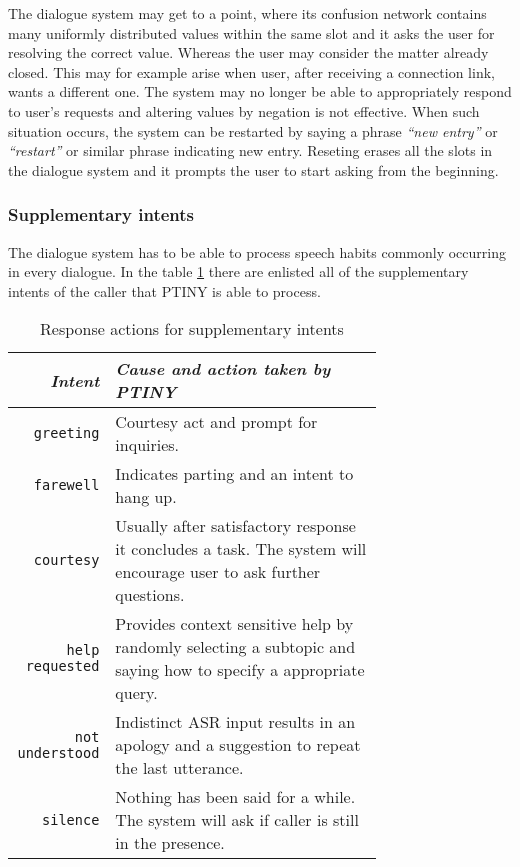 The dialogue system may get to a point, where its confusion network contains many uniformly distributed values within the same slot and it asks the user for resolving the correct value.
Whereas the user may consider the matter already closed.
This may for example arise when user, after receiving a connection link, wants a different one.
The system may no longer be able to appropriately respond to user's requests and altering values by negation is not effective.
When such situation occurs, the system can be restarted by saying a phrase \textit{``new entry''} or \textit{``restart''} or similar phrase indicating new entry.
Reseting erases all the slots in the dialogue system and it prompts the user to start asking from the beginning.

\newpage

\subsubsection{Supplementary intents} %

The dialogue system has to be able to process speech habits commonly occurring in every dialogue.
In the table \ref{table:sup} there are enlisted all of the supplementary intents of the caller that \ac{PTINY} is able to process.

\begin{table}[h]
\centering
\begin{tabular}{ r | p{0.73\linewidth} }
	\textit{Intent} & \textit{Cause and action taken by \ac{PTINY}} \\ \hline
	\texttt{greeting} & Courtesy act and prompt for inquiries.\\
	\texttt{farewell} & Indicates parting and an intent to hang up.\\
	\texttt{courtesy} & Usually after satisfactory response it concludes a task. The system will encourage user to ask further questions. \\
	\texttt{help requested} & Provides context sensitive help by randomly selecting a subtopic and saying how to specify a appropriate query. \\
	\texttt{not understood} & Indistinct \ac{ASR}  input results in an apology and a suggestion to repeat the last utterance.\\ %
	\texttt{silence} & Nothing has been said for a while. The system will ask if caller is still in the presence. %
\end{tabular}
\caption[Response actions for supplementary intents]{Response actions for supplementary intents}
\label{table:sup}
\end{table}

